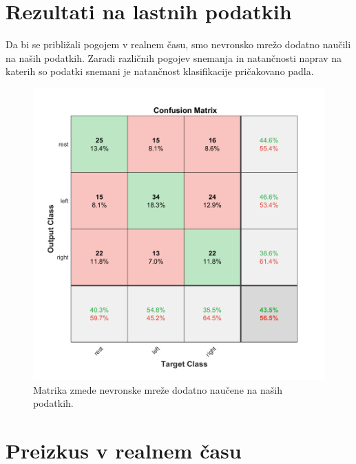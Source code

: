 \section{Rezultati na lastnih podatkih}
Da bi se približali pogojem v realnem času, smo nevronsko mrežo dodatno naučili na naših podatkih. Zaradi različnih pogojev snemanja in natančnosti naprav na katerih so podatki snemani je natančnost klasifikacije pričakovano padla.
\begin{figure}[h!]
\begin{center}
\includegraphics[width=0.5\linewidth]{slike/Confusion_13-20Hz_0s-4s_retrained.png}
\end{center}
\caption{Matrika zmede nevronske mreže dodatno naučene na naših podatkih.}
\end{figure}
\section{Preizkus v realnem času}

